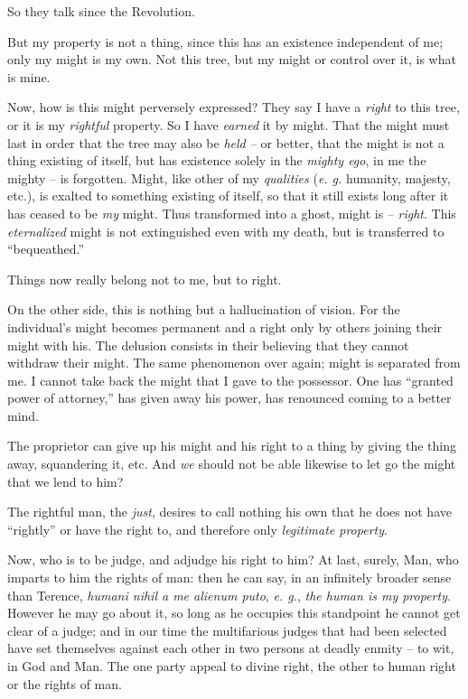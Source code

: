 \documentclass[12pt,a4paper]{book}
\begin{document}
So they talk since the Revolution.

But my property is not a thing, since this has an existence independent of me; 
only my might is my own. Not this tree, but my might or control over it, is 
what is mine.

Now, how is this might perversely expressed? They say I have a \textit{right} 
to this tree, or it is my \textit{rightful} property. So I have 
\textit{earned} it by might. That the might must last in order that the tree 
may also be \textit{held --} or better, that the might is not a thing existing 
of itself, but has existence solely in the \textit{mighty ego}, in me the 
mighty -- is forgotten. Might, like other of my \textit{qualities} (\textit{e. 
g.} humanity, majesty, etc.), is exalted to something existing of itself, so 
that it still exists long after it has ceased to be \textit{my} might. Thus 
transformed into a ghost, might is -- \textit{right}. This 
\textit{eternalized} might is not extinguished even with my death, but is 
transferred to ``bequeathed.''

Things now really belong not to me, but to right.

On the other side, this is nothing but a hallucination of vision. For the 
individual's might becomes permanent and a right only by others joining their 
might with his. The delusion consists in their believing that they cannot 
withdraw their might. The same phenomenon over again; might is separated from 
me. I cannot take back the might that I gave to the possessor. One has 
``granted power of attorney,'' has given away his power, has renounced 
coming to a better mind.

The proprietor can give up his might and his right to a thing by giving the 
thing away, squandering it, etc. And \textit{we} should not be able likewise 
to let go the might that we lend to him?

The rightful man, the \textit{just}, desires to call nothing his own that he 
does not have ``rightly'' or have the right to, and therefore only 
\textit{legitimate property}.

Now, who is to be judge, and adjudge his right to him? At last, surely, Man, 
who imparts to him the rights of man: then he can say, in an infinitely 
broader sense than Terence, \textit{humani nihil a me alienum puto}, 
\textit{e. g.}, \textit{the human is my property}. However he may go about it, 
so long as he occupies this standpoint he cannot get clear of a judge; and in 
our time the multifarious judges that had been selected have set themselves 
against each other in two persons at deadly enmity -- to wit, in God and Man. 
The one party appeal to divine right, the other to human right or the rights 
of man.
\end{document}
